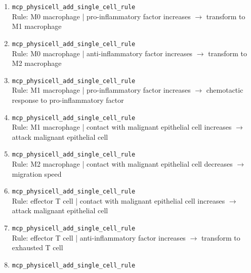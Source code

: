 \begin{enumerate}
\item[9.] \texttt{mcp\_\allowbreak{}physicell\_\allowbreak{}add\_\allowbreak{}single\_\allowbreak{}cell\_\allowbreak{}rule}
\hfill\\
\RaggedRight Rule: M0 macrophage | pro-inflammatory factor increases \ensuremath{\rightarrow} transform to M1 macrophage
\item[10.] \texttt{mcp\_\allowbreak{}physicell\_\allowbreak{}add\_\allowbreak{}single\_\allowbreak{}cell\_\allowbreak{}rule}
\hfill\\
\RaggedRight Rule: M0 macrophage | anti-inflammatory factor increases \ensuremath{\rightarrow} transform to M2 macrophage
\item[11.] \texttt{mcp\_\allowbreak{}physicell\_\allowbreak{}add\_\allowbreak{}single\_\allowbreak{}cell\_\allowbreak{}rule}
\hfill\\
\RaggedRight Rule: M1 macrophage | pro-inflammatory factor increases \ensuremath{\rightarrow} chemotactic response to pro-inflammatory factor
\item[12.] \texttt{mcp\_\allowbreak{}physicell\_\allowbreak{}add\_\allowbreak{}single\_\allowbreak{}cell\_\allowbreak{}rule}
\hfill\\
\RaggedRight Rule: M1 macrophage | contact with malignant epithelial cell increases \ensuremath{\rightarrow} attack malignant epithelial cell
\item[13.] \texttt{mcp\_\allowbreak{}physicell\_\allowbreak{}add\_\allowbreak{}single\_\allowbreak{}cell\_\allowbreak{}rule}
\hfill\\
\RaggedRight Rule: M2 macrophage | contact with malignant epithelial cell decreases \ensuremath{\rightarrow} migration speed
\item[14.] \texttt{mcp\_\allowbreak{}physicell\_\allowbreak{}add\_\allowbreak{}single\_\allowbreak{}cell\_\allowbreak{}rule}
\hfill\\
\RaggedRight Rule: effector T cell | contact with malignant epithelial cell increases \ensuremath{\rightarrow} attack malignant epithelial cell
\item[15.] \texttt{mcp\_\allowbreak{}physicell\_\allowbreak{}add\_\allowbreak{}single\_\allowbreak{}cell\_\allowbreak{}rule}
\hfill\\
\RaggedRight Rule: effector T cell | anti-inflammatory factor increases \ensuremath{\rightarrow} transform to exhausted T cell
\item[16.] \texttt{mcp\_\allowbreak{}physicell\_\allowbreak{}add\_\allowbreak{}single\_\allowbreak{}cell\_\allowbreak{}rule}
\hfill\\

\end{enumerate}
